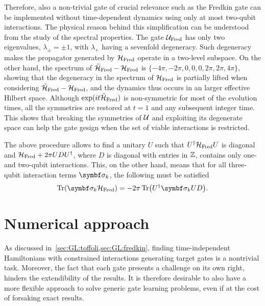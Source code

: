 Therefore, also a non-trivial gate of crucial relevance such as the Fredkin gate can be implemented without time-dependent dynamics using only at most two-qubit interactions.
The physical reason behind this simplification can be understood from the study of the spectral properties.
The gate ${\mathcal{U}}_{\operatorname{Fred}}$ has only two eigenvalues, $\lambda_\pm=\pm1$,
with $\lambda_+$ having a sevenfold degeneracy. Such degeneracy makes the propagator generated by ${\mathcal{H}}_{\operatorname{Fred}}$ operate in a two-level subspace.
On the other hand, the spectrum of $\tilde{{\mathcal{H}}}_{\operatorname{Fred}}-{\mathcal{H}}_{\operatorname{Fred}}$ is $\{{-}4\pi,{-}2\pi,0,0,0,2\pi,2\pi,4\pi\}$, showing that the degeneracy in the spectrum of ${\mathcal{H}}_{\operatorname{Fred}}$ is partially lifted when considering 
$\tilde{{\mathcal{H}}}_{\operatorname{Fred}}-{\mathcal{H}}_{\operatorname{Fred}}$, and the dynamics thus occurs in an  larger effective Hilbert space.  %
Although $\exponential(it\HTildeFred)$ is non-symmetric for most of the evolution times, all the symmetries are restored at $t=1$ and any subsequent integer time. This  shows that breaking the symmetries of ${\mathcal{U}}$ and exploiting its degenerate space can help the gate gesign when the set of viable interactions is restricted.

The above procedure allows to find a unitary $U$ such that
$U^\dagger{\mathcal{H}}_{\operatorname{Fred}} U$ is diagonal and
${\mathcal{H}}_{\operatorname{Fred}} + 2\pi U D U^\dagger$, where $D$ is diagonal with entries in $\mathbb{Z}$, contains only one- and two-qubit interactions.
This, on the other hand, means that for all three-qubit interaction terms $\bs\sigma_k$, the following must be satisfied
\begin{equation}
    \Tr(\bs\sigma_k\HFred) = -2\pi \Tr(U^\dagger\bs\sigma_k U D).
\end{equation}



\section{Numerical approach}
\label{sec:GL:numerical_approach}

As discussed in~\cref{sec:GL:toffoli,sec:GL:fredkin}, finding time-independent Hamiltonians with constrained interactions generating target gates is a nontrivial task. 
Moreover, the fact that each gate presents a challenge on its own right, hinders the extendibility of the results.
It is therefore desirable to also have a more flexible approach to solve generic gate learning problems, even if at the cost of forsaking exact results.

